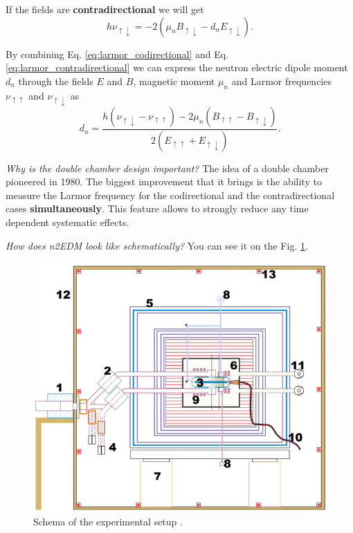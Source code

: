 If the fields are \textbf{contradirectional} we will get
\begin{equation}
	h\nu_{\uparrow \downarrow} = -2 \left( \mu_n B_{\uparrow \downarrow} - d_n E_{\uparrow \downarrow} \right).
	\label{eq:larmor_contradirectional}
\end{equation}

By combining Eq. \ref{eq:larmor_codirectional} and Eq. \ref{eq:larmor_contradirectional} we can express the neutron electric dipole moment $d_n$ through the fields $E$ and $B$, magnetic moment $\mu_n$ and Larmor frequencies $\nu_{\uparrow \uparrow}$ and $\nu_{\uparrow \downarrow}$ as
\begin{equation}
	d_n = \frac{h \left( \nu_{\uparrow \downarrow} - \nu_{\uparrow \uparrow} \right) - 2 \mu_n \left( B_{\uparrow \uparrow} - B_{\uparrow \downarrow} \right)}{2 \left( E_{\uparrow \uparrow} + E_{\uparrow \downarrow} \right)}.
\end{equation}

\textit{Why is the double chamber design important?} The idea of a double chamber pioneered \cite{Altarev1980} in 1980. The biggest improvement that it brings is the ability to measure the Larmor frequency for the codirectional and the contradirectional cases \textbf{simultaneously}. This feature allows to strongly reduce \cite{Abel2018} any time dependent systematic effects.

\textit{How does n2EDM look like schematically?} You can see it on the Fig. \ref{fig:n2edm_schema}.%
\begin{figure}[h]
	\centering
	\includegraphics[width=.82\textwidth]{img/n2edm_schema}
	\caption{Schema of the experimental setup \cite{Abel2018}.}
	\label{fig:n2edm_schema}
\end{figure}

